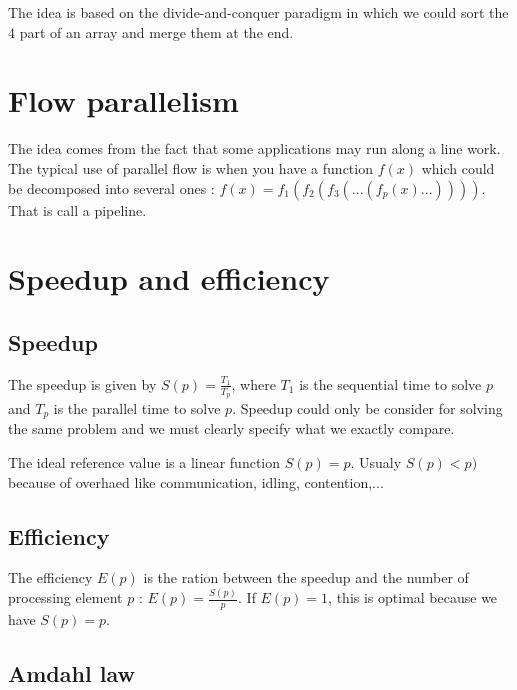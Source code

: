 \documentclass[11pt,a4paper]{report}
\begin{document}
The idea is based on the divide-and-conquer paradigm in which we could sort the $4$ part of an array and merge them at the end.


\section{Flow parallelism} %
\label{sec:Flow parallelism}

The idea comes from the fact that some applications may run along a line work. The typical use of parallel flow is when you have a function $f(x)$ which could be decomposed into several ones : $f(x) = f_1(f_2(f_3(...(f_p(x)...))))$. That is call a pipeline.


\section{Speedup and efficiency} %
\label{sec:Speedup and efficiency}

\subsection{Speedup} %
\label{sub:speedup}

The speedup is given by $S(p)=\frac{T_1}{T_p}$, where $T_1$ is the sequential time to solve $p$ and $T_p$ is the parallel time to solve $p$. Speedup could only be consider for solving the same problem and we must clearly specify what we exactly compare.

The ideal reference value is a linear function $S(p)=p$. Usualy $S(p) < p)$ because of overhaed like communication, idling, contention,...

\subsection{Efficiency} %
\label{sub:Efficiency}

The efficiency $E(p)$ is the ration between the speedup and the number of processing element $p$ : $E(p)=\frac{S(p)}{p}$. If $E(p) = 1$, this is optimal because we have $S(p)=p$.


\subsection{Amdahl law} %
\label{sub:Amdahl law}
\end{document}
